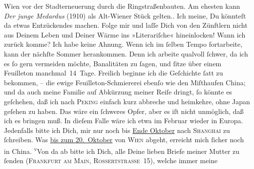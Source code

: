 \begin{ledgroupsized}[t]{13cm}
{{{                     Wien vor der Stadterneuerung durch die Ringstraßenbauten. Am ehesten kann \emph{Der junge Medardus} (1910) als
                     Alt-Wiener Stück gelten.}}}\label{K_L02854-6h}. Ich meine,
               Du könnteſt da etwas Entzückendes machen. Folge mir und laſſe Dich von den Zünftlern
               nicht aus Deinem Leben und Deiner Wärme ins »Literariſche« hineinlocken!\pend
           \pstart
           {\pb}Wann ich zurück komme? Ich habe keine Ahnung. Wenn
               ich im ſelben Tempo fortarbeite, kann der nächſte Sommer herankommen. Denn ich
               arbeite qualvoll ſchwer, da ich es ſo gern vermeiden möchte, Banalitäten zu ſagen,
               und ſitze über einem Feuilleton manchmal 14 Tage. Freilich beginne ich die Geſchichte
               ſatt zu bekommen, – die ewige Feuilleton-Schmiererei ebenſo wie den Miſthaufen China; und da  auch meine Familie auf Abkürzung meiner Reiſe {\pb}dringt, ſo könnte es geſchehen, daß ich nach \textsc{Peking} einfach kurz abbreche und heimkehre, ohne Japan geſehen zu haben. Das wäre ein ſchweres Opfer, aber es iſt nicht
               unmöglich, daß ich es bringen muß. In dieſem Falle wäre ich etwa im Februar wieder in Europa. Jedenfalls bitte ich Dich, mir nur noch bis \uline{Ende Oktober} nach \textsc{Shanghai} zu ſchreiben. Was \uline{bis zum 20. Oktober} von \textsc{Wien} abgeht, erreicht mich ſicher noch in China. {\pb}\substVorne{}\textsuperscript{v}\substDazwischen{}V\substHinten{}on da ab bitte ich Dich, alle Deine 
               lieben Briefe meiner Mutter
               zu ſenden (\textsc{Frankfurt am Main,  Rossertstraſse 15}), welche  immer meine

\end{ledgroupsized}
